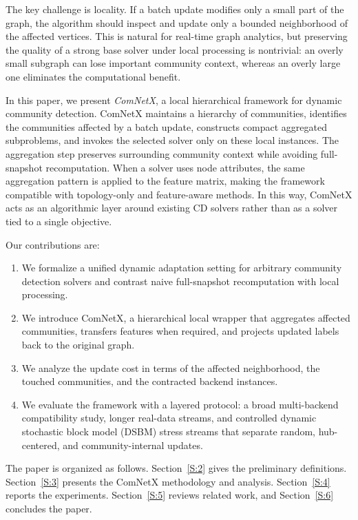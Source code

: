 \documentclass[conference]{IEEEtran}
\theoremstyle{definition}
\begin{document}
The key challenge is locality. If a batch update modifies only a small part of the graph, the algorithm should inspect and update only a bounded neighborhood of the affected vertices. This is natural for real-time graph analytics, but preserving the quality of a strong base solver under local processing is nontrivial: an overly small subgraph can lose important community context, whereas an overly large one eliminates the computational benefit.

In this paper, we present \textit{ComNetX}, a local hierarchical framework for dynamic community detection. ComNetX maintains a hierarchy of communities, identifies the communities affected by a batch update, constructs compact aggregated subproblems, and invokes the selected solver only on these local instances. The aggregation step preserves surrounding community context while avoiding full-snapshot recomputation. When a solver uses node attributes, the same aggregation pattern is applied to the feature matrix, making the framework compatible with topology-only and feature-aware methods. In this way, ComNetX acts as an algorithmic layer around existing CD solvers rather than as a solver tied to a single objective.

Our contributions are:
\begin{enumerate}[leftmargin=*]
    \item We formalize a unified dynamic adaptation setting for arbitrary community detection solvers and contrast naive full-snapshot recomputation with local processing.
    \item We introduce ComNetX, a hierarchical local wrapper that aggregates affected communities, transfers features when required, and projects updated labels back to the original graph.
    \item We analyze the update cost in terms of the affected neighborhood, the touched communities, and the contracted backend instances.
    \item We evaluate the framework with a layered protocol: a broad
    multi-backend compatibility study, longer real-data streams, and controlled
    dynamic stochastic block model (DSBM) stress streams that separate random,
    hub-centered, and
    community-internal updates.
\end{enumerate}

The paper is organized as follows. Section~\ref{S:2} gives the preliminary definitions. Section~\ref{S:3} presents the ComNetX methodology and analysis. Section~\ref{S:4} reports the experiments. Section~\ref{S:5} reviews related work, and Section~\ref{S:6} concludes the paper.
\end{document}
